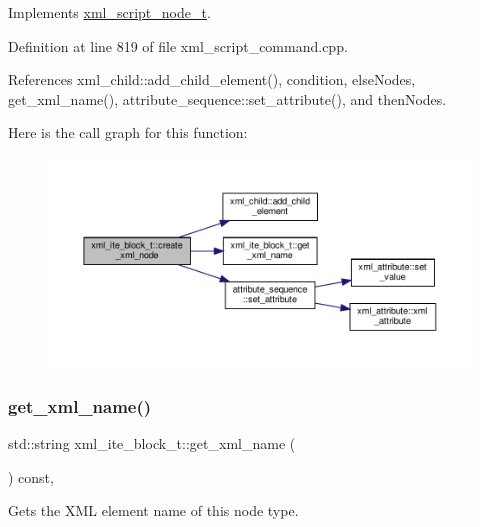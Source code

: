Implements \hyperlink{classxml__script__node__t_adaf9c51a079c4617f3845c6133eb477f}{xml\+\_\+script\+\_\+node\+\_\+t}.



Definition at line 819 of file xml\+\_\+script\+\_\+command.\+cpp.



References xml\+\_\+child\+::add\+\_\+child\+\_\+element(), condition, else\+Nodes, get\+\_\+xml\+\_\+name(), attribute\+\_\+sequence\+::set\+\_\+attribute(), and then\+Nodes.

Here is the call graph for this function\+:
\nopagebreak
\begin{figure}[H]
\begin{center}
\leavevmode
\includegraphics[width=350pt]{df/d5b/classxml__ite__block__t_a1b9744c412acd0ded712ab4c8956ce27_cgraph}
\end{center}
\end{figure}
\mbox{\label{classxml__ite__block__t_a82a199264ab67116550596a27ff2b051}} 
\subsubsection{\texorpdfstring{get\+\_\+xml\+\_\+name()}{get\_xml\_name()}}
{\footnotesize\ttfamily std\+::string xml\+\_\+ite\+\_\+block\+\_\+t\+::get\+\_\+xml\+\_\+name (\begin{DoxyParamCaption}{ }\end{DoxyParamCaption}) const\hspace{0.3cm}{\ttfamily [override]}, {\ttfamily [virtual]}}



Gets the X\+ML element name of this node type. 



